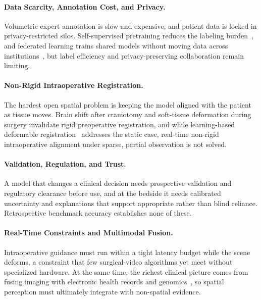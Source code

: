 \paragraph{Data Scarcity, Annotation Cost, and Privacy.} Volumetric expert annotation is slow and expensive, and patient data is locked in privacy-restricted silos. 
Self-supervised pretraining reduces the labeling burden~\cite{huang2023ssl}, and federated learning trains shared models without moving data across institutions~\cite{rieke2020federated}, but label efficiency and privacy-preserving collaboration remain limiting.

\paragraph{Non-Rigid Intraoperative Registration.} The hardest open spatial problem is keeping the model aligned with the patient as tissue moves. Brain shift after craniotomy and soft-tissue deformation during surgery invalidate rigid preoperative registration, and while learning-based deformable registration~\cite{balakrishnan2019voxelmorph} addresses the static case, real-time non-rigid intraoperative alignment under sparse, partial observation is not solved.

\paragraph{Validation, Regulation, and Trust.} A model that changes a clinical decision needs prospective validation and regulatory clearance before use, and at the bedside it needs calibrated uncertainty and explanations that support appropriate rather than blind reliance. Retrospective benchmark accuracy establishes none of these.

\paragraph{Real-Time Constraints and Multimodal Fusion.} Intraoperative guidance must run within a tight latency budget while the scene deforms, a constraint that few surgical-video algorithms yet meet without specialized hardware. 
At the same time, the richest clinical picture comes from fusing imaging with electronic health records and genomics~\cite{acosta2022multimodal}, so spatial perception must ultimately integrate with non-spatial evidence.

